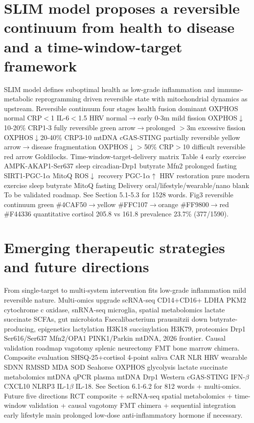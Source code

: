\documentclass[review]{elsarticle}
\begin{document}
\section{SLIM model proposes a reversible continuum from health to disease and a time-window-target framework}
SLIM model defines suboptimal health as low-grade inflammation and immune-metabolic reprogramming driven reversible state with mitochondrial dynamics as upstream. Reversible continuum four stages health fusion dominant OXPHOS normal CRP$<$1 IL-6$<$1.5 HRV normal$\rightarrow$early 0-3m mild fission OXPHOS$\downarrow$10-20\% CRP1-3 fully reversible green arrow$\rightarrow$prolonged $>$3m excessive fission OXPHOS$\downarrow$20-40\% CRP3-10 mtDNA cGAS-STING partially reversible yellow arrow$\rightarrow$disease fragmentation OXPHOS$\downarrow$$>$50\% CRP$>$10 difficult reversible red arrow Goldilocks. Time-window-target-delivery matrix Table 4 early exercise AMPK-AKAP1-Ser637 sleep circadian-Drp1 butyrate Mfn2 prolonged fasting SIRT1-PGC-1$\alpha$ MitoQ ROS$\downarrow$ recovery PGC-1$\alpha$$\uparrow$ HRV restoration pure modern exercise sleep butyrate MitoQ fasting Delivery oral/lifestyle/wearable/nano blank To be validated roadmap. See Section 5.1-5.3 for 1528 words. Fig3 reversible continuum green \#4CAF50$\rightarrow$yellow \#FFC107$\rightarrow$orange \#FF9800$\rightarrow$red \#F44336 quantitative cortisol 205.8 vs 161.8 prevalence 23.7\% (377/1590).

\section{Emerging therapeutic strategies and future directions}
From single-target to multi-system intervention fits low-grade inflammation mild reversible nature. Multi-omics upgrade scRNA-seq CD14+CD16+ LDHA PKM2 cytochrome c oxidase, snRNA-seq microglia, spatial metabolomics lactate succinate SCFAs, gut microbiota Faecalibacterium prausnitzii down butyrate-producing, epigenetics lactylation H3K18 succinylation H3K79, proteomics Drp1 Ser616/Ser637 Mfn2/OPA1 PINK1/Parkin mtDNA, 2026 frontier. Causal validation roadmap vagotomy splenic neurectomy FMT bone marrow chimera. Composite evaluation SHSQ-25+cortisol 4-point saliva CAR NLR HRV wearable SDNN RMSSD MDA SOD Seahorse OXPHOS glycolysis lactate succinate metabolomics mtDNA qPCR plasma mtDNA Drp1 Western cGAS-STING IFN-$\beta$ CXCL10 NLRP3 IL-1$\beta$ IL-18. See Section 6.1-6.2 for 812 words + multi-omics. Future five directions RCT composite + scRNA-seq spatial metabolomics + time-window validation + causal vagotomy FMT chimera + sequential integration early lifestyle main prolonged low-dose anti-inflammatory hormone if necessary.
\end{document}
